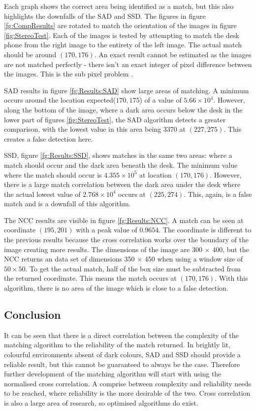 Each graph shows the correct area being identified as a match, but this also highlights the downfalls of the SAD and SSD. The figures in figure \ref{fg:CompResults} are rotated to match the orientation of the images in figure \ref{fig:StereoTest}. Each of the images is tested by attempting to match the desk phone from the right image to the entirety of the left image. The actual match should be around $(170, 176)$. An exact result cannot be estimated as the images are not matched perfectly - there isn't an exact integer of pixel difference between the images. This is the sub pixel problem \citep{haller2012design}.

SAD results in figure \ref{fg:Results:SAD} show large areas of matching. A minimum occurs around the location expected($170,175$) of a value of $5.66\times 10^4$. However, along the bottom of the image, where a dark area occurs below the desk in the lower part of figures \ref{fig:StereoTest}, the SAD algorithm detects a greater comparison, with the lowest value in this area being $3370$ at $(227, 275)$. This creates a false detection here. 

SSD, figure \ref{fg:Results:SSD}, shows matches in the same two areas: where a match should occur and the dark area beneath the desk. The minimum value where the match should occur is $4.355 \times 10^5$ at location $(170,176)$. However, there is a large match correlation between the dark area under the desk where the actual lowest value of $2.768\times10^4$ occurs at $(225,274)$. This, again, is a false match and is a downfall of this algorithm. 

The NCC results are visible in figure \ref{fg:Results:NCC}. A match can be seen at coordinate $(195,201)$ with a peak value of $0.9654$. The coordinate is different to the previous results because the cross correlation works over the boundary of the image creating more results. The dimensions of the image are 300 $\times$ 400, but the NCC returns an data set of dimensions 350 $\times$ 450 when using a window size of $50\times 50$. To get the actual match, half of the box size must be subtracted from the returned coordinate. This means the match occurs at $(170,176)$. With this algorithm, there is no area of the image which is close to a false detection. 

\subsection{Conclusion}
It can be seen that there is a direct correlation between the complexity of the matching algorithm to the reliability of the match returned. In brightly lit, colourful environments absent of dark colours, SAD and SSD should provide a reliable result, but this cannot be guaranteed to always be the case. Therefore further development of the matching algorithm will start with using the normalised cross correlation. A comprise between complexity and reliability needs to be reached, where reliability is the more desirable of the two. Cross correlation is also a large area of research, so optimised algorithms do exist.

